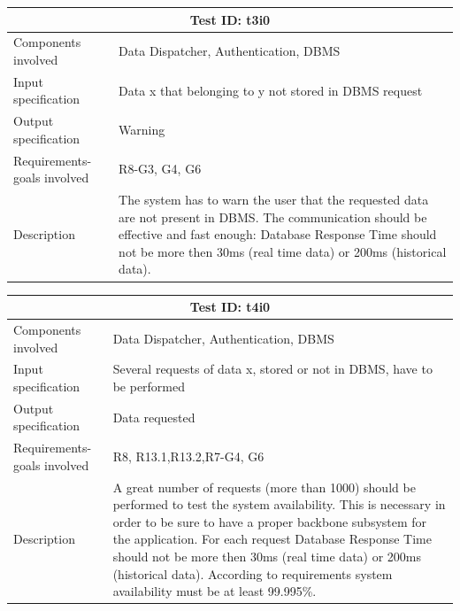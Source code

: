 \begin{table}[H]
\centering
\begin{tabular}{ |p{4.5cm}||p{11cm}|  }
 \hline
 \multicolumn{2}{|c|}{Test ID: t3i0} \\
 
 \hline 
Components involved  	& 	 Data Dispatcher, Authentication, DBMS\\
 Input specification  	& 	  Data x that belonging to y not stored in DBMS request\\
Output specification  	& 	 Warning\\
Requirements-goals involved & R8-G3, G4, G6 \\
Description  	& 	The system has to warn the user that the requested data are not present in DBMS. The communication should be effective and fast enough: Database Response Time should not be more then 30ms (real time data) or 200ms (historical data).\\
 \hline
\end{tabular}
\end{table}
\begin{table}[H]
\centering
\begin{tabular}{ |p{4.5cm}||p{11cm}|  }
 \hline
 \multicolumn{2}{|c|}{Test ID: t4i0} \\
 
 \hline 
Components involved  	& 	 Data Dispatcher, Authentication, DBMS\\
 Input specification  	& 	Several requests of data x, stored or not in DBMS, have to be performed\\
Output specification  	& Data requested\\
Requirements-goals involved & R8, R13.1,R13.2,R7-G4, G6\\
Description  	& 	A great number of requests (more than 1000) should be performed to test the system availability. This is necessary in order to be sure to have a proper backbone subsystem for the application. For each request Database Response Time should not be more then 30ms (real time data) or 200ms (historical data). According to requirements system availability must be at least 99.995\%.  	\\
 \hline
\end{tabular}
\end{table}


